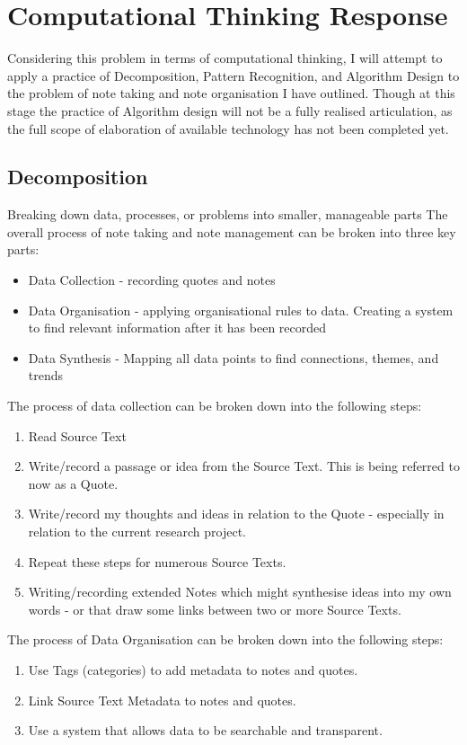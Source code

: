 \documentclass{article}
\begin{document}
\section{Computational Thinking Response}

Considering this problem in terms of computational thinking, I will attempt to apply a practice of Decomposition, Pattern Recognition, and Algorithm Design to the problem of note taking and note organisation I have outlined. Though at this stage the practice of Algorithm design will not be a fully realised articulation, as the full scope of elaboration of available technology has not been completed yet.

\subsection{Decomposition}
Breaking down data, processes, or problems into smaller, manageable parts
The overall process of note taking and note management can be broken into three key parts:
\begin{itemize}
    \item Data Collection - recording quotes and notes
    \item Data Organisation - applying organisational rules to data. Creating a system to find relevant information after it has been recorded
    \item Data Synthesis - Mapping all data points to find connections, themes, and trends
\end{itemize}

The process of data collection can be broken down into the following steps:
\begin{enumerate}
    \item Read Source Text
    \item Write/record a passage or idea from the Source Text. This is being referred to now as a Quote.
    \item Write/record my thoughts and ideas in relation to the Quote - especially in relation to the current research project.
    \item Repeat these steps for numerous Source Texts.
    \item Writing/recording extended Notes which might synthesise ideas into my own words - or that draw some links between two or more Source Texts.
\end{enumerate}

The process of Data Organisation can be broken down into the following steps:
\begin{enumerate}
    \item Use Tags (categories) to add metadata to notes and quotes.
    \item Link Source Text Metadata to notes and quotes.
    \item Use a system that allows data to be searchable and transparent.
\end{enumerate}
\end{document}
